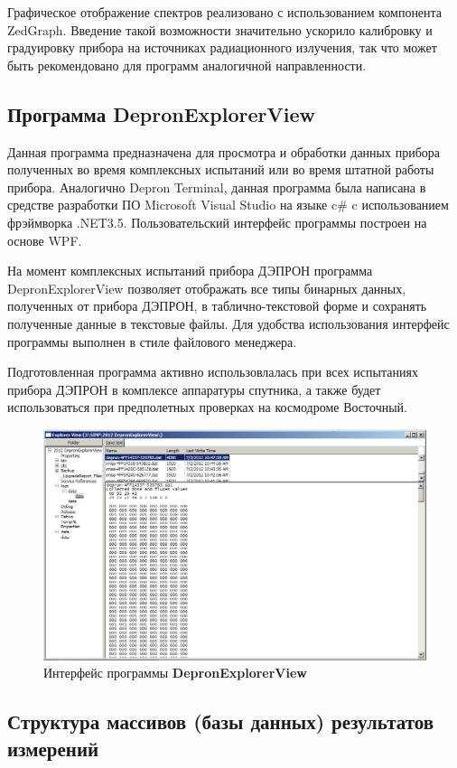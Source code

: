 Графическое отображение спектров реализовано с использованием компонента ZedGraph. Введение такой возможности значительно ускорило калибровку и градуировку прибора на источниках радиационного излучения, так что может быть рекомендовано для программ аналогичной направленности.

\subsection{Программа DepronExplorerView}

Данная программа предназначена для просмотра и обработки данных прибора полученных во время комплексных испытаний или во время штатной работы прибора. Аналогично Depron Terminal, данная программа была написана в средстве разработки ПО Microsoft Visual Studio на языке c\# c использованием фрэймворка .NET3.5. Пользовательский интерфейс программы построен на основе WPF.


На момент комплексных испытаний прибора ДЭПРОН программа DepronExplorerView позволяет отображать все типы бинарных данных, полученных от прибора ДЭПРОН, в таблично-текстовой форме и сохранять полученные данные в текстовые файлы. Для удобства использования интерфейс программы выполнен в стиле файлового менеджера. 

Подготовленная программа активно использовлалась при всех испытаниях прибора ДЭПРОН в комплексе аппаратуры спутника, а также будет использоваться при предполетных проверках на космодроме Восточный.

\begin{figure}
\centering
\includegraphics[width=0.8\linewidth]{images/depron_explorer}
\caption{Интерфейс программы \textbf{DepronExplorerView}}
\label{fig:depron_explorer}
\end{figure}


\subsection{Структура массивов (базы данных) результатов измерений}


